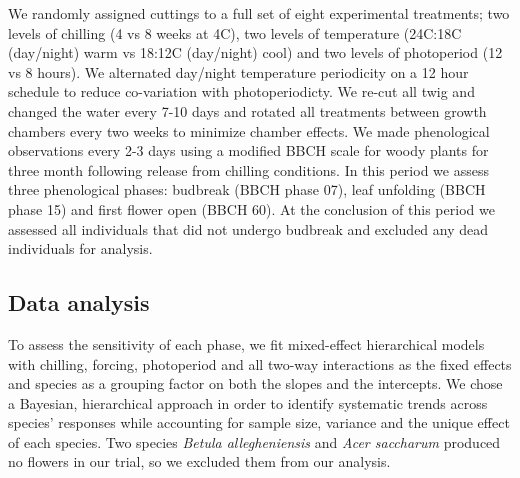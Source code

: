 \documentclass[11pt]{article}
\begin{document}
\noindent We randomly assigned cuttings to a full set of eight experimental treatments; two levels of chilling (4 vs 8 weeks at 4\degree C), two levels of temperature (24\degree C:18\degree C (day/night) warm vs 18\degree:12\degree C (day/night) cool) and two levels of photoperiod (12 vs 8 hours). We alternated day/night temperature periodicity on a 12 hour schedule to reduce co-variation with photoperiodicty. We re-cut all twig and changed the water every 7-10 days and rotated all treatments between growth chambers every two weeks to minimize chamber effects. We made phenological observations every 2-3 days using a modified BBCH scale for woody plants \citep{Finn2007} for three month following release from chilling conditions. In this period we assess three phenological phases: budbreak (BBCH phase 07), leaf unfolding (BBCH phase 15) and first flower open (BBCH 60). At the conclusion of this period we assessed all individuals that did not undergo budbreak and excluded any dead individuals for analysis.

\subsection*{Data analysis}
\noindent To assess the sensitivity of each phase, we fit mixed-effect hierarchical models with chilling, forcing, photoperiod and all two-way interactions as the fixed effects and species as a grouping factor on both the slopes and the intercepts. We chose a Bayesian, hierarchical approach in order to identify systematic trends across species' responses while accounting for sample size, variance and the unique effect of each species. Two species \textit{Betula allegheniensis} and \textit{Acer saccharum} produced no flowers in our trial, so we excluded them from our analysis.\\

\end{document}
